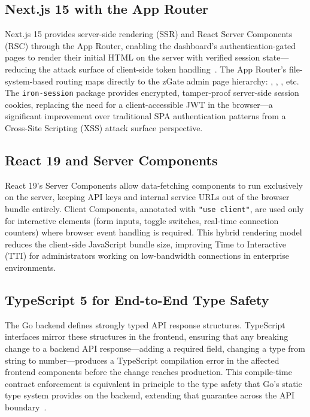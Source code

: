 \subsection{Next.js 15 with the App Router}

Next.js 15 provides server-side rendering (SSR) and React Server Components (RSC) through the App Router, enabling the dashboard's authentication-gated pages to render their initial HTML on the server with verified session state---reducing the attack surface of client-side token handling~\cite{nextjs-docs}. The App Router's file-system-based routing maps directly to the zGate admin page hierarchy: , , , etc. The \texttt{iron-session} package provides encrypted, tamper-proof server-side session cookies, replacing the need for a client-accessible JWT in the browser---a significant improvement over traditional SPA authentication patterns from a Cross-Site Scripting (XSS) attack surface perspective.

\subsection{React 19 and Server Components}

React 19's Server Components allow data-fetching components to run exclusively on the server, keeping API keys and internal service URLs out of the browser bundle entirely. Client Components, annotated with \texttt{"use client"}, are used only for interactive elements (form inputs, toggle switches, real-time connection counters) where browser event handling is required. This hybrid rendering model reduces the client-side JavaScript bundle size, improving Time to Interactive (TTI) for administrators working on low-bandwidth connections in enterprise environments.

\subsection{TypeScript 5 for End-to-End Type Safety}

The Go backend defines strongly typed API response structures. TypeScript interfaces mirror these structures in the frontend, ensuring that any breaking change to a backend API response---adding a required field, changing a type from string to number---produces a TypeScript compilation error in the affected frontend components before the change reaches production. This compile-time contract enforcement is equivalent in principle to the type safety that Go's static type system provides on the backend, extending that guarantee across the API boundary~\cite{typescript-docs}.

